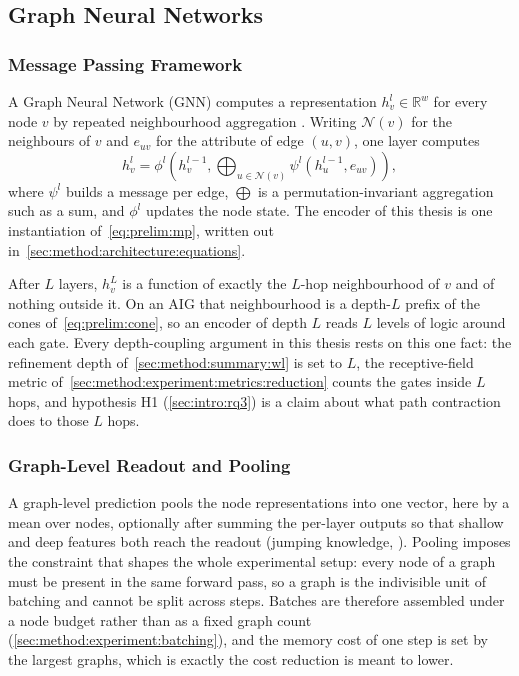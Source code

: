 \subsection{Graph Neural Networks}
\label{sec:prelim:gnn}

\subsubsection{Message Passing Framework}
\label{sec:prelim:gnn:mp}
A Graph Neural Network (GNN) computes a representation $h_v^{l} \in \mathbb{R}^{w}$ for
every node $v$ by repeated neighbourhood aggregation
\citep{kipf2017gcn,hamilton2017graphsage}. Writing $\mathcal{N}(v)$ for the neighbours of
$v$ and $e_{uv}$ for the attribute of edge $(u, v)$, one layer computes
\begin{equation}
    h_v^{l} = \phi^{l}\!\left( h_v^{l-1},
        \bigoplus_{u \in \mathcal{N}(v)} \psi^{l}\!\left( h_u^{l-1}, e_{uv} \right)
    \right),
    \label{eq:prelim:mp}
\end{equation}
where $\psi^{l}$ builds a message per edge, $\bigoplus$ is a permutation-invariant
aggregation such as a sum, and $\phi^{l}$ updates the node state. The encoder of this
thesis is one instantiation of~\eqref{eq:prelim:mp}, written out
in~\ref{sec:method:architecture:equations}.

After $L$ layers, $h_v^{L}$ is a function of exactly the $L$-hop neighbourhood of $v$ and
of nothing outside it. On an AIG that neighbourhood is a depth-$L$ prefix of the cones
of~\eqref{eq:prelim:cone}, so an encoder of depth $L$ reads $L$ levels of logic around each
gate. Every depth-coupling argument in this thesis rests on this one fact: the refinement
depth of~\ref{sec:method:summary:wl} is set to $L$, the receptive-field metric
of~\ref{sec:method:experiment:metrics:reduction} counts the gates inside $L$ hops, and
hypothesis H1 (\ref{sec:intro:rq3}) is a claim about what path contraction does to those
$L$ hops.

\subsubsection{Graph-Level Readout and Pooling}
\label{sec:prelim:gnn:readout}
A graph-level prediction pools the node representations into one vector, here by a mean
over nodes, optionally after summing the per-layer outputs so that shallow and deep
features both reach the readout (jumping knowledge, \citealp{xu2018jk}). Pooling imposes
the constraint that shapes the whole experimental setup: every node of a graph must be
present in the same forward pass, so a graph is the indivisible unit of batching and
cannot be split across steps. Batches are therefore assembled under a node budget rather
than as a fixed graph count (\ref{sec:method:experiment:batching}), and the memory cost
of one step is set by the largest graphs, which is exactly the cost reduction is meant to
lower.

